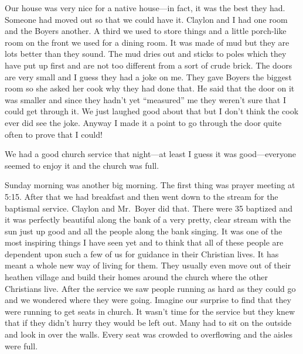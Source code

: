 \documentclass[
]{book}
\begin{document}
Our house was very nice for a native house---in fact, it was the best they had. Someone had moved out so that we could have it. Claylon and I had one room and the Boyers another. A third we used to store things and a little porch-like room on the front we used for a dining room. It was made of mud but they are lots better than they sound. The mud dries out and sticks to poles which they have put up first and are not too different from a sort of crude brick. The doors are very small and I guess they had a joke on me. They gave Boyers the biggest room so she asked her cook why they had done that. He said that the door on it was smaller and since they hadn't yet ``measured'' me they weren't sure that I could get through it. We just laughed good about that but I don't think the cook ever did see the joke. Anyway I made it a point to go through the door quite often to prove that I could!

We had a good church service that night---at least I guess it was good---everyone seemed to enjoy it and the church was full.

Sunday morning was another big morning. The first thing was prayer meeting at 5:15. After that we had breakfast and then went down to the stream for the baptismal service. Claylon and Mr.~Boyer did that. There were 35 baptized and it was perfectly beautiful along the bank of a very pretty, clear stream with the sun just up good and all the people along the bank singing. It was one of the most inspiring things I have seen yet and to think that all of these people are dependent upon such a few of us for guidance in their Christian lives. It has meant a whole new way of living for them. They usually even move out of their heathen village and build their homes around the church where the other Christians live. After the service we saw people running as hard as they could go and we wondered where they were going. Imagine our surprise to find that they were running to get seats in church. It wasn't time for the service but they knew that if they didn't hurry they would be left out. Many had to sit on the outside and look in over the walls. Every seat was crowded to overflowing and the aisles were full.
\end{document}
